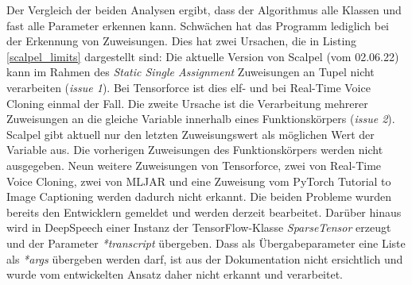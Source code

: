 \documentclass[german,bachelor]{swsLeipzig}
\begin{document}
\noindent Der Vergleich der beiden Analysen ergibt, dass der Algorithmus alle Klassen und fast alle Parameter erkennen kann.
Schwächen hat das Programm lediglich bei der Erkennung von Zuweisungen.
Dies hat zwei Ursachen, die in Listing \ref{scalpel_limits} dargestellt sind:
Die aktuelle Version von Scalpel (vom 02.06.22) kann im Rahmen des \textit{Static Single Assignment} Zuweisungen an Tupel
nicht verarbeiten (\textit{issue 1}).
Bei Tensorforce ist dies elf- und bei Real-Time Voice Cloning einmal der Fall.
Die zweite Ursache ist die Verarbeitung mehrerer Zuweisungen an die gleiche Variable innerhalb eines Funktionskörpers (\textit{issue 2}).
Scalpel gibt aktuell nur den letzten Zuweisungswert als möglichen Wert der Variable aus.
Die vorherigen Zuweisungen des Funktionskörpers werden nicht ausgegeben.
Neun weitere Zuweisungen von Tensorforce, zwei von Real-Time Voice Cloning, zwei von MLJAR und
eine Zuweisung vom PyTorch Tutorial to Image Captioning werden dadurch nicht erkannt.
Die beiden Probleme wurden bereits den Entwicklern gemeldet und werden derzeit bearbeitet.
Darüber hinaus wird in DeepSpeech einer Instanz der TensorFlow-Klasse \textit{SparseTensor} erzeugt und der Parameter \textit{*transcript} übergeben.
Dass als Übergabeparameter eine Liste als \textit{*args} übergeben werden darf, ist aus der Dokumentation nicht ersichtlich
und wurde vom entwickelten Ansatz daher nicht erkannt und verarbeitet.\\
\end{document}
